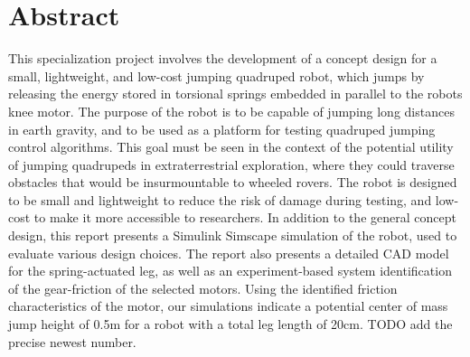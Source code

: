 \section*{Abstract}

This specialization project involves the development of a concept design for a small, lightweight, and low-cost jumping quadruped robot, which jumps by releasing the energy stored in torsional springs embedded in parallel to the robots knee motor. The purpose of the robot is to be capable of jumping long distances in earth gravity, and to be used as a platform for testing quadruped jumping control algorithms. This goal must be seen in the context of the potential utility of jumping quadrupeds in extraterrestrial exploration, where they could traverse obstacles that would be insurmountable to wheeled rovers. The robot is designed to be small and lightweight to reduce the risk of damage during testing, and low-cost to make it more accessible to researchers. In addition to the general concept design, this report presents a Simulink Simscape simulation of the robot, used to evaluate various design choices. The report also presents a detailed CAD model for the spring-actuated leg, as well as an experiment-based system identification of the gear-friction of the selected motors. Using the identified friction characteristics of the motor, our simulations indicate a potential center of mass jump height of 0.5m for a robot with a total leg length of 20cm. TODO add the precise newest number. 
